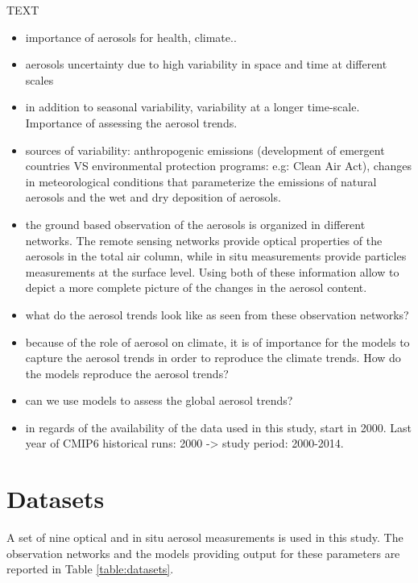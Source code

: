 \documentclass[journal abbreviation, manuscript]{copernicus}
\begin{document}
\introduction  %
TEXT
\begin{itemize}
 \item importance of aerosols for health, climate..
 \item aerosols uncertainty due to high variability in space and time at different scales
 \item in addition to seasonal variability, variability at a longer time-scale. Importance of assessing the aerosol trends.
 \item sources of variability: anthropogenic emissions (development of emergent countries VS environmental protection programs: e.g: Clean Air Act), changes in meteorological conditions that parameterize the emissions of natural aerosols and the wet and dry deposition of aerosols.
 \item the ground based observation of the aerosols is organized in different networks. The remote sensing networks provide optical properties of the aerosols in the total air column, while in situ measurements provide particles measurements at the surface level. Using both of these information allow to depict a more complete picture of the changes in the aerosol content.
 \item what do the aerosol trends look like as seen from these observation networks?
 \item because of the role of aerosol on climate, it is of importance for the models to capture the aerosol trends in order to reproduce the climate trends. How do the models reproduce the aerosol trends?
 \item can we use models to assess the global aerosol trends?
 \item in regards of the availability of the data used in this study, start in 2000. Last year of CMIP6 historical runs: 2000 -> study period: 2000-2014.
\end{itemize}


\section{Datasets}
A set of nine optical and in situ aerosol measurements is used in this study. The observation networks and the models providing output for these parameters are reported in Table \ref{table:datasets}.
\end{document}
